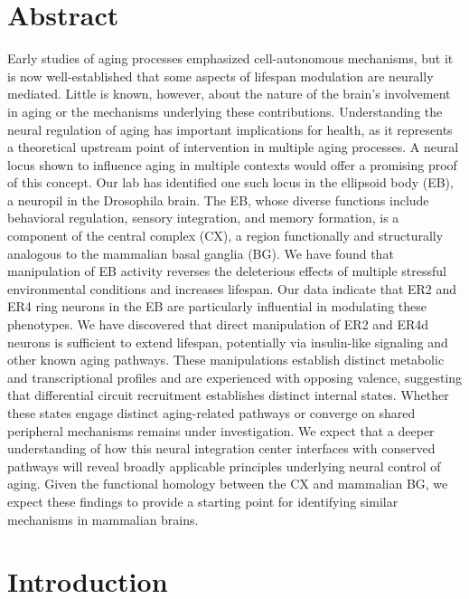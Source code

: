 \section*{Abstract}
Early studies of aging processes emphasized cell-autonomous mechanisms, but it is now well-established that some aspects of lifespan modulation are neurally mediated. 
Little is known, however, about the nature of the brain's involvement in aging or the mechanisms underlying these contributions. Understanding the neural regulation of aging has important implications for health, as it represents a theoretical upstream point of intervention in multiple aging processes. 
A neural locus shown to influence aging in multiple contexts would offer a promising proof of this concept. Our lab has identified one such locus in the ellipsoid body (EB), a neuropil in the Drosophila brain. The EB, whose diverse functions include behavioral regulation, sensory integration, and memory formation, is a component of the central complex (CX), a region functionally and structurally analogous to the mammalian basal ganglia (BG). 
We have found that manipulation of EB activity reverses the deleterious effects of multiple stressful environmental conditions and increases lifespan. Our data indicate that ER2 and ER4 ring neurons in the EB are particularly influential in modulating these phenotypes. 
We have discovered that direct manipulation of ER2 and ER4d neurons is sufficient to extend lifespan, potentially via insulin-like signaling and other known aging pathways. 
These manipulations establish distinct metabolic and transcriptional profiles and are experienced with opposing valence, suggesting that differential circuit recruitment establishes distinct internal states. 
Whether these states engage distinct aging-related pathways or converge on shared peripheral mechanisms remains under investigation. 
We expect that a deeper understanding of how this neural integration center interfaces with conserved pathways will reveal broadly applicable principles underlying neural control of aging. 
Given the functional homology between the CX and mammalian BG, we expect these findings to provide a starting point for identifying similar mechanisms in mammalian brains.

\section*{Introduction}

